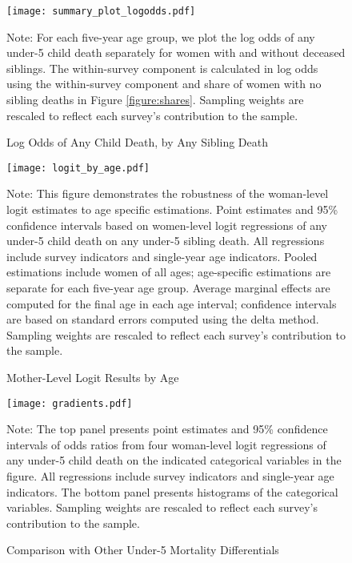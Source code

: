 \documentclass[12pt,english]{article}
\begin{document}
\begin{figure}
    \caption{Log Odds of Any Child Death, by Any Sibling Death}
    \label{figure:logodds}
    \begin{center}
    \texttt{[image: summary\_plot\_logodds.pdf]}
    \end{center}
\footnotesize{Note: For each five-year age group, we plot the log odds of any under-5 child death separately for women with and without deceased siblings. The within-survey component is calculated in log odds using the within-survey component and share of women with no sibling deaths in Figure \ref{figure:shares}. Sampling weights are rescaled to reflect each survey's contribution to the sample.}
\end{figure}

\begin{figure}
    \caption{Mother-Level Logit Results by Age}
    \label{figure:logitbyage}
    \begin{center}
    \texttt{[image: logit\_by\_age.pdf]}
    \end{center}
\footnotesize{Note: This figure demonstrates the robustness of the woman-level logit estimates to age specific estimations. Point estimates and 95\% confidence intervals based on women-level logit regressions of any under-5 child death on any under-5 sibling death. All regressions include survey indicators and single-year age indicators. Pooled estimations include women of all ages; age-specific estimations are separate for each five-year age group. Average marginal effects are computed for the final age in each age interval; confidence intervals are based on standard errors computed using the delta method. Sampling weights are rescaled to reflect each survey's contribution to the sample.}
\end{figure}

\begin{figure}
    \caption{Comparison with Other Under-5 Mortality Differentials}
    \label{figure:gradients}
    \begin{center}
    \texttt{[image: gradients.pdf]}
    \end{center}
\footnotesize{Note: The top panel presents point estimates and 95\% confidence intervals of odds ratios from four woman-level logit regressions of any under-5 child death  on the indicated categorical variables in the figure. All regressions include survey indicators and single-year age indicators. The bottom panel presents histograms of the categorical variables. Sampling weights are rescaled to reflect each survey's contribution to the sample.}
\end{figure}
\end{document}
